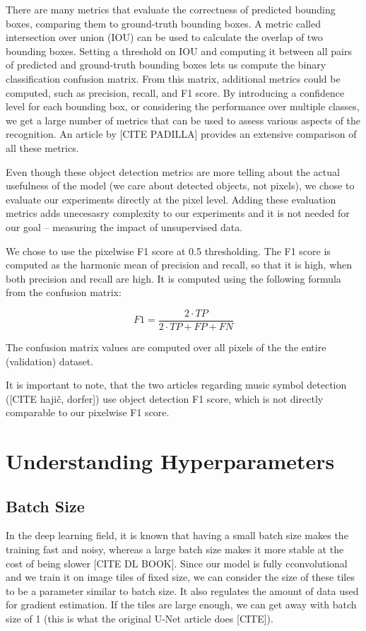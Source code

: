 There are many metrics that evaluate the correctness of predicted bounding boxes, comparing them to ground-truth bounding boxes. A metric called intersection over union (IOU) can be used to calculate the overlap of two bounding boxes. Setting a threshold on IOU and computing it between all pairs of predicted and ground-truth bounding boxes lets us compute the binary classification confusion matrix. From this matrix, additional metrics could be computed, such as precision, recall, and F1 score. By introducing a confidence level for each bounding box, or considering the performance over multiple classes, we get a large number of metrics that can be used to assess various aspects of the recognition. An article by [CITE PADILLA] provides an extensive comparison of all these metrics.

Even though these object detection metrics are more telling about the actual usefulness of the model (we care about detected objects, not pixels), we chose to evaluate our experiments directly at the pixel level. Adding these evaluation metrics adds unecesasry complexity to our experiments and it is not needed for our goal -- measuring the impact of unsupervised data.

We chose to use the pixelwise F1 score at 0.5 thresholding. The F1 score is computed as the harmonic mean of precision and recall, so that it is high, when both precision and recall are high. It is computed using the following formula from the confusion matrix:

$$
    F1 = \frac{2 \cdot TP}{2 \cdot TP + FP + FN}
$$

The confusion matrix values are computed over all pixels of the the entire (validation) dataset.

It is important to note, that the two articles regarding music symbol detection ([CITE hajič, dorfer]) use object detection F1 score, which is not directly comparable to our pixelwise F1 score.


\section{Understanding Hyperparameters}
\label{sec:UnderstandingHyperparameters}


\subsection{Batch Size}
\label{sec:BatchSize}

In the deep learning field, it is known that having a small batch size makes the training fast and noisy, whereas a large batch size makes it more stable at the cost of being slower [CITE DL BOOK]. Since our model is fully cconvolutional and we train it on image tiles of fixed size, we can consider the size of these tiles to be a parameter similar to batch size. It also regulates the amount of data used for gradient estimation. If the tiles are large enough, we can get away with batch size of 1 (this is what the original U-Net article does [CITE]).

